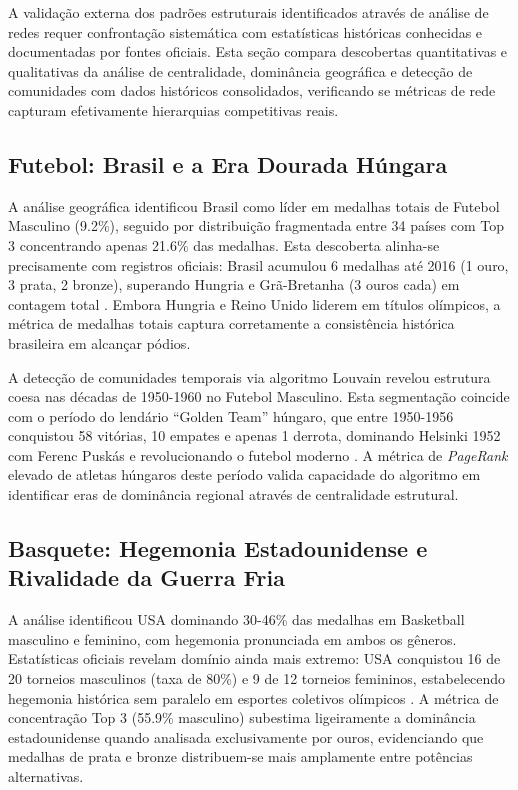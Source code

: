 A validação externa dos padrões estruturais identificados através de análise de redes requer confrontação sistemática com estatísticas históricas conhecidas e documentadas por fontes oficiais. Esta seção compara descobertas quantitativas e qualitativas da análise de centralidade, dominância geográfica e detecção de comunidades com dados históricos consolidados, verificando se métricas de rede capturam efetivamente hierarquias competitivas reais.

\subsection{Futebol: Brasil e a Era Dourada Húngara}

A análise geográfica identificou Brasil como líder em medalhas totais de Futebol Masculino (9.2\%), seguido por distribuição fragmentada entre 34 países com Top 3 concentrando apenas 21.6\% das medalhas. Esta descoberta alinha-se precisamente com registros oficiais: Brasil acumulou 6 medalhas até 2016 (1 ouro, 3 prata, 2 bronze), superando Hungria e Grã-Bretanha (3 ouros cada) em contagem total \cite{OlympicsFootballWinners2024}. Embora Hungria e Reino Unido liderem em títulos olímpicos, a métrica de medalhas totais captura corretamente a consistência histórica brasileira em alcançar pódios.

A detecção de comunidades temporais via algoritmo Louvain revelou estrutura coesa nas décadas de 1950-1960 no Futebol Masculino. Esta segmentação coincide com o período do lendário ``Golden Team'' húngaro, que entre 1950-1956 conquistou 58 vitórias, 10 empates e apenas 1 derrota, dominando Helsinki 1952 com Ferenc Puskás e revolucionando o futebol moderno \cite{OlympicsHungaryGoldenTeam2024}. A métrica de \textit{PageRank} elevado de atletas húngaros deste período valida capacidade do algoritmo em identificar eras de dominância regional através de centralidade estrutural.

\subsection{Basquete: Hegemonia Estadounidense e Rivalidade da Guerra Fria}

A análise identificou USA dominando 30-46\% das medalhas em Basketball masculino e feminino, com hegemonia pronunciada em ambos os gêneros. Estatísticas oficiais revelam domínio ainda mais extremo: USA conquistou 16 de 20 torneios masculinos (taxa de 80\%) e 9 de 12 torneios femininos, estabelecendo hegemonia histórica sem paralelo em esportes coletivos olímpicos \cite{NBCBasketballHistory2024}. A métrica de concentração Top 3 (55.9\% masculino) subestima ligeiramente a dominância estadounidense quando analisada exclusivamente por ouros, evidenciando que medalhas de prata e bronze distribuem-se mais amplamente entre potências alternativas.

